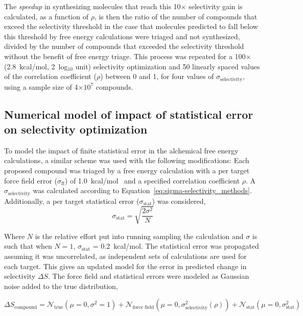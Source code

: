 \documentclass[phd,tocprelim]{cornell}
\begin{document}
The \emph{speedup} in synthesizing molecules that reach this 10$\times$ selectivity gain is calculated, as a function of $\rho$, is then the ratio of the number of compounds that exceed the selectivity threshold in the case that molecules predicted to fall below this threshold by free energy calculations were triaged and not synthesized, divided by the number of compounds that exceeded the selectivity threshold without the benefit of free energy triage.
This process was repeated for a 100$\times$ (2.8~kcal/mol, 2~log$_{10}$ unit) selectivity optimization and 50 linearly spaced values of the correlation coefficient ($\rho$) between 0 and 1, for four values of $\sigma_\text{selectivity}$, using a sample size of 4$\times10^7$ compounds. 

\subsection{Numerical model of impact of statistical error on selectivity optimization}

To model the impact of finite statistical error in the alchemical free energy calculations, a similar scheme was used with the following modifications:
Each proposed compound was triaged by a free energy calculation with a per target force field error ($\sigma_\text{ff}$) of 1.0~kcal/mol~\citep{Harder2016-zn}
and a specified correlation coefficient $\rho$.  
A $\sigma_\text{selectivity}$ was calculated according to Equation~\ref{eq:sigma-selectivity_methods}. 
Additionally, a per target statistical error ($\sigma_\text{stat}$) was considered, 
\begin{equation}\label{eq15}
\sigma_\text{stat} = \sqrt{\frac{2\sigma^2}{N}}
\end{equation}

Where $N$ is the relative effort put into running sampling the calculation and $\sigma$ is such that when $N = 1$, $\sigma_\text{stat}$ = 0.2~kcal/mol. 
The statistical error was propagated assuming it was uncorrelated, as independent sets of calculations are used for each target. This gives an updated model for the error in predicted change in selectivity $\Delta S$. The force field and statistical errors were modeled as Gaussian noise added to the true distribution, 

\begin{equation}\label{stat_error}
\Delta S_\text{compound} = \mathcal{N}_\text{true}(\mu =0, \sigma^2 = 1) + \mathcal{N}_\text{force field}(\mu =0, \sigma_\text{selectivity}^2(\rho)) + \mathcal{N}_\text{stat}(\mu =0, \sigma_\text{stat}^2)
\end{equation}
\end{document}
